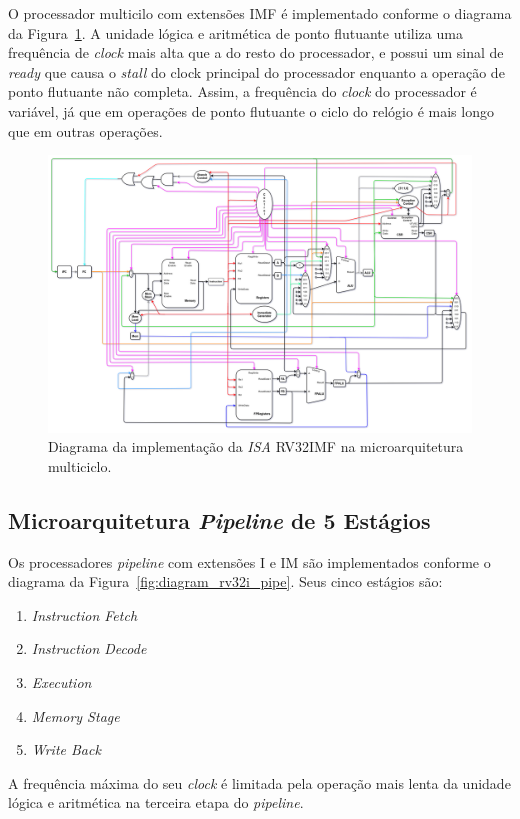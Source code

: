         { O processador multicilo com extensões IMF é implementado conforme o
            diagrama da Figura~\ref{fig:diagram_rv32imf_multi}. A unidade lógica
            e aritmética de ponto flutuante utiliza uma frequência de \textit{clock}
            mais alta que a do resto do processador, e possui um sinal de
            \textit{ready} que causa o \textit{stall} do clock principal do
            processador enquanto a operação de ponto flutuante não completa.
            Assim, a frequência do \textit{clock} do processador é variável, já
            que em operações de ponto flutuante o ciclo do relógio é mais longo
            que em outras operações.
        }

        \begin{figure}[H]
        \centering
            \includegraphics[width=1\linewidth]{../images/uarch_diagrams/multicycle-RV32IMF.png}
            \caption{Diagrama da implementação da \textit{ISA} RV32IMF na
            microarquitetura multiciclo.}\label{fig:diagram_rv32imf_multi}
        \end{figure}


    \subsection{Microarquitetura \textit{Pipeline} de 5 Estágios}
        { Os processadores \textit{pipeline} com extensões I e IM são
            implementados conforme o diagrama da Figura~\ref{fig:diagram_rv32i_pipe}.
            Seus cinco estágios são:
            \begin{enumerate}
                \item \textit{Instruction Fetch}
                \item \textit{Instruction Decode}
                \item \textit{Execution}
                \item \textit{Memory Stage}
                \item \textit{Write Back}
            \end{enumerate}
        }
        { A frequência máxima do seu \textit{clock} é limitada pela operação
            mais lenta da unidade lógica e aritmética na terceira etapa do
            \textit{pipeline}.
        }

